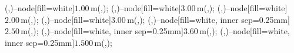 {{		\small

		 (\QQx,\Ay)--node[fill=white]{$1.00\,$m}(\QQx,\By);
		 (\QQx,\By)--node[fill=white]{$3.00\,$m}(\QQx,\Cy);
		 (\Qx,\Ey)--node[fill=white]{$2.00\,$m}(\Qx,\Dy);
		 (\Qx,\Dy)--node[fill=white]{$3.00\,$m}(\Qx,\Cy);
		 (\Cx,\Py)--node[fill=white, inner sep=0.25mm]{$2.50\,$m}(\Ex,\Py);
		 (\Ax,\Py)--node[fill=white, inner sep=0.25mm]{$3.60\,$m}(\Cx,\Py);
		 (\Ex,\Py)--node[fill=white, inner sep=0.25mm]{$1.500\,$m}(\Fx,\Py);



	}
}
